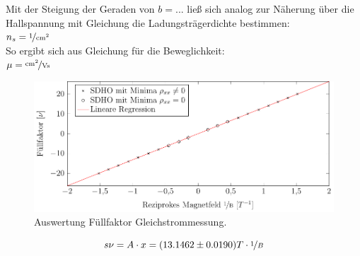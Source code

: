 Mit der Steigung der Geraden von $b=...$  %
ließ sich analog zur Näherung über die Hallspannung mit Gleichung %
die Ladungsträgerdichte bestimmen:
\\
$n_s= \unitfrac{1}{cm^2}$
\\
So ergibt sich aus Gleichung %
für die Beweglichkeit:
\\
$\mu= \unitfrac{cm^2}{Vs}$  %


\begin{figure}[h]
	\centering
	\includegraphics{graphs/dc/auswertung.pdf}
	\caption[Auswertung Füllfaktor Gleichstrommessung]{
		Auswertung Füllfaktor Gleichstrommessung.
	}
	\label{fig:dc_ausw}
\end{figure}

\begin{equation}s
\nu= A\cdot x=(13.1462 \pm 0.0190)T \cdot \nicefrac{1}{B}
\end{equation}